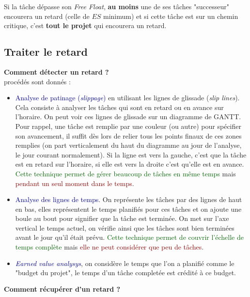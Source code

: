\documentclass{article}
\newcommand{\gre}[1]{\textcolor{darkgreen}{#1}}
\newcommand{\blu}[1]{\textcolor{darkblue}{#1}}
\newcommand{\rouge}[1]{\textcolor{darkred}{#1}}
\begin{document}
\begin{sffamily}
Si la tâche dépasse son \textit{Free Float}, \textbf{au moins} une de ses tâches "successeur" encourera un retard (celle de $ES$ 
minimum) et si cette tâche est sur un chemin critique, c'est \textbf{tout le projet} qui encourera un retard.

\newpage

\subsection{Traiter le retard}

\noindent \textbf{Comment détecter un retard ?} \\

 procédés sont donnés :
\begin{itemize}
\item \blu{Analyse de patinage (\textit{slippage})} en utilisant les lignes de glissade (\textit{slip lines}). Cela consiste 
à analyser les tâches qui sont en retard ou en avance sur l'horaire. On peut voir ces lignes de glissade sur un diagramme de 
GANTT. Pour rappel, une tâche est remplie par une couleur (ou autre) pour spécifier son avancement, il suffit dès lors de relier 
tous les points finaux de ces zones remplies (on part verticalement du haut du diagramme au jour de l'analyse, le jour courant 
normalement). Si la ligne est vers la gauche, c'est que la tâche est en retard sur l'horaire, si elle est vers la droite c'est 
qu'elle est en avance. \gre{Cette technique permet de gérer beaucoup de tâches en même temps} mais \rouge{pendant un seul moment 
dans le temps}.
\item \blu{Analyse des lignes de temps}. On représente les tâches par des lignes de haut en bas, elles représentent le temps 
planifiés pour ces tâches et on ajoute une boule au bout pour signifier que la tâche est terminée. On met sur l'axe vertical le 
temps actuel, on vérifie ainsi que les tâches sont bien terminées avant le jour qu'il était prévu. \gre{Cette technique permet 
de couvrir l'échelle de temps complète} mais \rouge{elle ne peut considérer que peu de tâches}.
\item \blu{\textit{Earned value analysys}}, on considère le temps que l'on a planifié comme le "budget du projet", le temps 
d'un tâche completée est crédité à ce budget.\\
\end{itemize}

\noindent \textbf{Comment récupérer d'un retard ?} \\


\end{sffamily}
\end{document}
